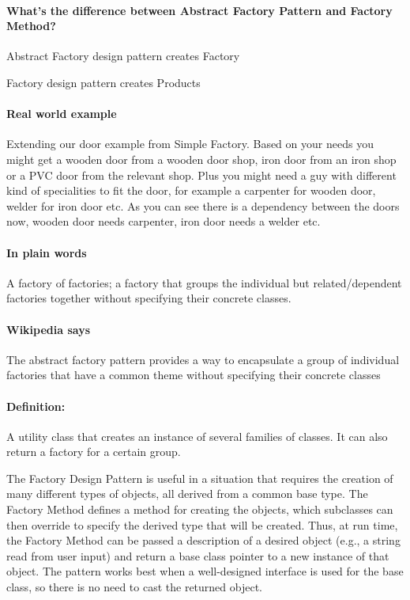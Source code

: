 \documentclass{book}
\begin{document}
\paragraph{What's the difference between Abstract Factory Pattern and Factory Method?}\mbox{}

    Abstract Factory design pattern creates Factory

    Factory design pattern creates Products

\paragraph{Real world example}

    Extending our door example from Simple Factory.
    Based on your needs you might get a wooden door from a wooden door shop, iron door from an iron shop or a PVC door from the relevant shop.
    Plus you might need a guy with different kind of specialities to fit the door, for example a carpenter for wooden door, welder for iron door etc.
    As you can see there is a dependency between the doors now, wooden door needs carpenter, iron door needs a welder etc.

\paragraph{In plain words}

    A factory of factories; a factory that groups the individual but related/dependent factories together without specifying their concrete classes.

\paragraph{Wikipedia says}

    The abstract factory pattern provides a way to encapsulate a group of individual factories that have a common theme without specifying their concrete classes
\paragraph{Definition:} A utility class that creates an instance of several families of classes. It can also return a factory for a certain group.

The Factory Design Pattern is useful in a situation that requires the creation of many different types of objects, all derived from a common base type.
The Factory Method defines a method for creating the objects, which subclasses can then override to specify the derived type that will be created.
Thus, at run time, the Factory Method can be passed a description of a desired object (e.g., a string read from user input) and return a base class pointer to a new instance of that object.
The pattern works best when a well-designed interface is used for the base class, so there is no need to cast the returned object.
\end{document}
